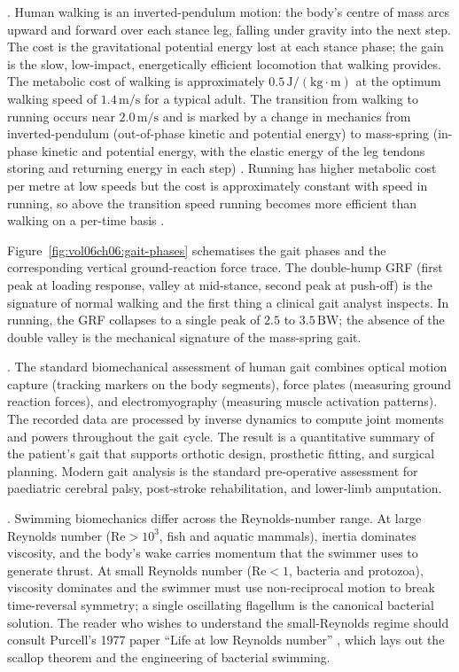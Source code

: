 . Human walking is an inverted-pendulum motion:
the body's centre of mass arcs upward and forward over each stance
leg, falling under gravity into the next step. The cost is the
gravitational potential energy lost at each stance phase; the
gain is the slow, low-impact, energetically efficient locomotion
that walking provides. The metabolic cost of walking is approximately
$0.5\,\text{J}/(\text{kg}\cdot\text{m})$ at the optimum walking
speed of $1.4\,\text{m}/\text{s}$ for a typical adult. The transition
from walking to running occurs near $2.0\,\text{m}/\text{s}$ and is
marked by a change in mechanics from inverted-pendulum (out-of-phase
kinetic and potential energy) to mass-spring (in-phase kinetic and
potential energy, with the elastic energy of the leg tendons storing
and returning energy in each step)
\cite[p.~R250]{paper:v6c06-cavagna-1977}. Running has higher metabolic
cost per metre at low speeds but the cost is approximately constant
with speed in running, so above the transition speed running becomes
more efficient than walking on a per-time basis
\cite[ch.~9]{text:winter-biomechanics-human}.

Figure~\ref{fig:vol06ch06:gait-phases} schematises the gait phases
and the corresponding vertical ground-reaction force trace. The
double-hump GRF (first peak at loading response, valley at mid-stance,
second peak at push-off) is the signature of normal walking and the
first thing a clinical gait analyst inspects. In running, the GRF
collapses to a single peak of $2.5$ to $3.5\,\text{BW}$; the absence
of the double valley is the mechanical signature of the mass-spring
gait.



. The standard biomechanical assessment of
human gait combines optical motion capture (tracking markers on the
body segments), force plates (measuring ground reaction forces), and
electromyography (measuring muscle activation patterns). The
recorded data are processed by inverse dynamics to compute joint
moments and powers throughout the gait cycle. The result is a
quantitative summary of the patient's gait that supports orthotic
design, prosthetic fitting, and surgical planning. Modern gait
analysis is the standard pre-operative assessment for paediatric
cerebral palsy, post-stroke rehabilitation, and lower-limb
amputation.

. Swimming biomechanics
differ across the Reynolds-number range. At large Reynolds number
($\text{Re} > 10^3$, fish and aquatic mammals), inertia dominates
viscosity, and the body's wake carries momentum that the swimmer
uses to generate thrust. At small Reynolds number
($\text{Re} < 1$, bacteria and protozoa), viscosity dominates and the
swimmer must use non-reciprocal motion to break time-reversal
symmetry; a single oscillating flagellum is the canonical bacterial
solution. The reader who wishes to understand the small-Reynolds
regime should consult Purcell's 1977 paper ``Life at low Reynolds
number'' \cite[p.~5]{paper:v6c06-purcell-1977}, which lays out the
scallop theorem and the engineering of bacterial swimming.

